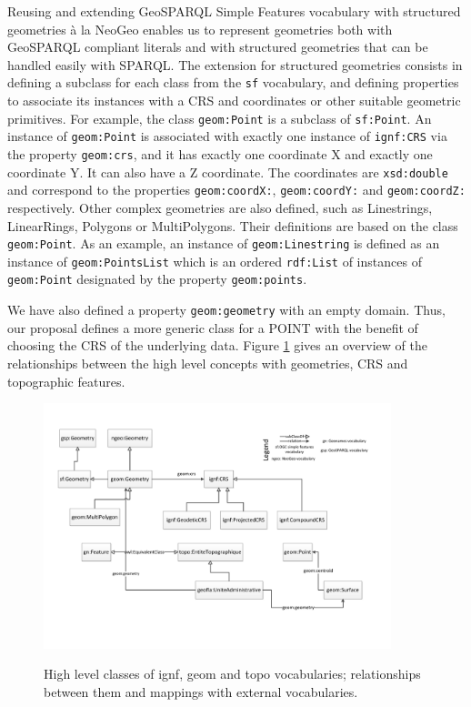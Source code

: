 Reusing and extending GeoSPARQL Simple Features vocabulary with structured geometries  \`a la NeoGeo enables us to represent geometries both with GeoSPARQL compliant literals and with structured geometries that can be handled easily with SPARQL. The extension for structured geometries consists in defining a subclass for each class from the \texttt{sf} vocabulary, and defining properties to associate its instances with a CRS and coordinates or other suitable geometric primitives. For example, the class \texttt{geom:Point} is a subclass of \texttt{sf:Point}. An instance of \texttt{geom:Point} is associated with exactly one instance of \texttt{ignf:CRS} via the property \texttt{geom:crs}, and it
has exactly one coordinate X and exactly one coordinate Y. It can also have a Z coordinate. The coordinates are \texttt{xsd:double} and correspond to the properties \texttt{geom:coordX:}, \texttt{geom:coordY:} and \texttt{geom:coordZ:} respectively. Other complex geometries are also defined, such as Linestrings, LinearRings, Polygons or MultiPolygons. Their definitions are based on the class \texttt{geom:Point}. As an example, an instance of \texttt{geom:Linestring} is defined as an instance of \texttt{geom:PointsList} which is an ordered \texttt{rdf:List} of instances of \texttt{geom:Point} designated by the property \texttt{geom:points}.


We have also defined a property \texttt{geom:geometry} with an empty domain. Thus, our proposal defines a more generic class for a \textsf{POINT} with the benefit of choosing the CRS of the underlying data. Figure \ref{fig:geomcrs} gives an overview of the relationships between the high level concepts with geometries, CRS and topographic features.

\begin{figure}[!htbp]
\vspace{-13pt}
  \begin{center}
  \includegraphics[width=0.9\textwidth]{img/vocabs-ign.pdf}
  \vspace{-15pt}
  \caption{High level classes of ignf, geom and topo vocabularies; relationships between them and mappings with external vocabularies.}
  \vspace{-10pt}
  \label{fig:geomcrs}
  \end{center}
\end{figure}

